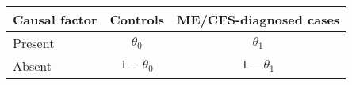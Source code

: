 \begin{tabular}{lcc} 
\toprule
Causal factor & Controls     & ME/CFS-diagnosed cases  \\ 
\midrule
Present       & $\theta_0$   & $\theta_1$              \\
Absent        & $1-\theta_0$ & $1-\theta_1$            \\
\bottomrule
\end{tabular}